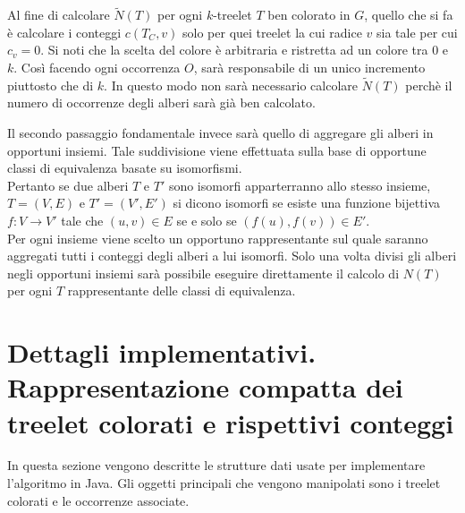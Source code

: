Al fine di calcolare $\widetilde{N}(T) $ per ogni $ k $-treelet $ T $ ben colorato in $ G $, quello che si fa è calcolare i conteggi $ c(T_C,v) $ solo per quei treelet la cui radice $ v $ sia tale per cui $ c_v = 0 $.
Si noti che la scelta del colore è arbitraria e ristretta ad un colore tra $ 0 $ e $ k $.
Così facendo ogni occorrenza $ O $, sarà responsabile di un unico incremento piuttosto che di $ k $.
In questo modo non sarà necessario calcolare $ \widetilde{N}(T) $ perchè il numero di occorrenze degli alberi sarà già ben calcolato.

Il secondo passaggio fondamentale invece sarà quello di aggregare gli alberi in opportuni insiemi.
Tale suddivisione viene effettuata sulla base di opportune classi di equivalenza basate su isomorfismi.\\
Pertanto se due alberi $ T $ e $ T' $ sono isomorfi apparterranno allo stesso insieme, $ T = (V,E)$ e $ T'=(V',E') $ si dicono isomorfi se esiste una funzione bijettiva $ f : V \rightarrow V' $ tale che $ (u,v)\in E $ se e solo se $ (f(u),f(v)) \in E' $.\\
Per ogni insieme viene scelto un opportuno rappresentante sul quale saranno aggregati tutti i conteggi degli alberi a lui isomorfi.
Solo una volta divisi gli alberi negli opportuni insiemi sarà possibile eseguire direttamente il calcolo di $ N(T) $ per ogni $ T $ rappresentante delle classi di equivalenza.



\section{Dettagli implementativi. Rappresentazione compatta dei treelet colorati e rispettivi conteggi}
\label{section 2}
In questa sezione vengono descritte le strutture dati usate per implementare l'algoritmo in Java.
Gli oggetti principali che vengono manipolati sono i treelet colorati e le occorrenze associate.

